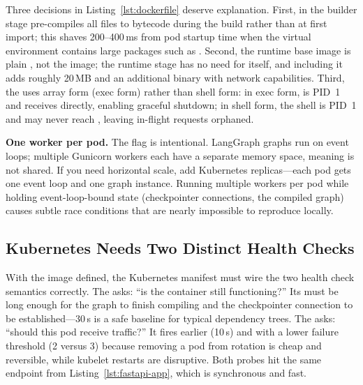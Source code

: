 Three decisions in Listing~\ref{lst:dockerfile} deserve explanation. First,
 in the builder stage pre-compiles all 
files to  bytecode during the build rather than at first import;
this shaves 200--400\,ms from pod startup time when the virtual environment
contains large packages such as . Second, the runtime
base image is plain , not the 
image; the runtime stage has no need for  itself, and including it
adds roughly 20\,MB and an additional binary with network capabilities.
Third, the  uses array form (exec form) rather than shell
form: in exec form,  is PID~1 and receives 
directly, enabling graceful shutdown; in shell form, the shell is PID~1 and
 may never reach , leaving in-flight requests
orphaned.

\begin{warningbox}
  \textbf{One worker per pod.}\quad
  The  flag is intentional. LangGraph graphs run on
   event loops; multiple Gunicorn workers each have a separate
  memory space, meaning  is not shared. If you need
  horizontal scale, add Kubernetes replicas---each pod gets one event loop and
  one graph instance. Running multiple workers per pod while holding
  event-loop-bound state (checkpointer connections, the compiled graph) causes
  subtle race conditions that are nearly impossible to reproduce locally.
\end{warningbox}

\subsection*{Kubernetes Needs Two Distinct Health Checks}

With the image defined, the Kubernetes manifest must wire the two health
check semantics correctly. The  asks: ``is the container
still functioning?'' Its  must be long enough for
the graph to finish compiling and the checkpointer connection to be
established---30\,s is a safe baseline for typical dependency trees. The
 asks: ``should this pod receive traffic?'' It fires
earlier (10\,s) and with a lower failure threshold (2 versus 3) because
removing a pod from rotation is cheap and reversible, while kubelet restarts
are disruptive. Both probes hit the same  endpoint from
Listing~\ref{lst:fastapi-app}, which is synchronous and fast.

